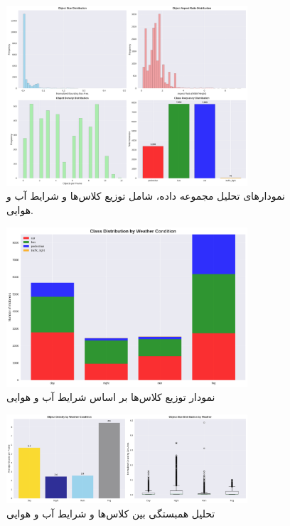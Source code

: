 \documentclass[oneside]{report}
\begin{document}
\begin{figure}[H]
  \centering
  \includegraphics[width=0.8\textwidth]{images/data1/advanced_dataset_analysis.png}
  \caption{نمودارهای تحلیل مجموعه داده، شامل توزیع کلاس‌ها و شرایط آب و هوایی.}
\end{figure}

\begin{figure}[H]
  \centering
  \includegraphics[width=0.8\textwidth]{images/data1/class_distribution_by_weather.png}
  \caption{نمودار توزیع کلاس‌ها بر اساس شرایط آب و هوایی}
\end{figure}

\begin{figure}[H]
  \centering
  \includegraphics[width=0.8\textwidth]{images/data1/correlation_analysis.png}
  \caption{تحلیل همبستگی بین کلاس‌ها و شرایط آب و هوایی}
\end{figure}
\end{document}
